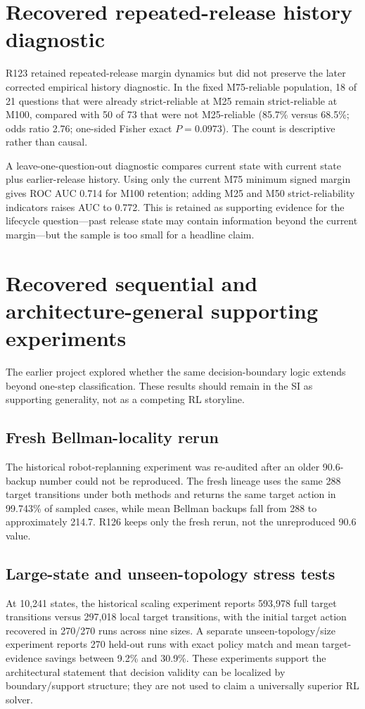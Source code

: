 \documentclass[11pt,letterpaper]{article}
\theoremstyle{plain}
\newcommand{\1}{\mathbf 1}
\begin{document}
\section{Recovered repeated-release history diagnostic}
R123 retained repeated-release margin dynamics but did not preserve the later corrected empirical history diagnostic. In the fixed M75-reliable population, 18 of 21 questions that were already strict-reliable at M25 remain strict-reliable at M100, compared with 50 of 73 that were not M25-reliable (85.7\% versus 68.5\%; odds ratio 2.76; one-sided Fisher exact $P=0.0973$). The count is descriptive rather than causal.

A leave-one-question-out diagnostic compares current state with current state plus earlier-release history. Using only the current M75 minimum signed margin gives ROC AUC 0.714 for M100 retention; adding M25 and M50 strict-reliability indicators raises AUC to 0.772. This is retained as supporting evidence for the lifecycle question---past release state may contain information beyond the current margin---but the sample is too small for a headline claim.

\clearpage
\section{Recovered sequential and architecture-general supporting experiments}
The earlier project explored whether the same decision-boundary logic extends beyond one-step classification. These results should remain in the SI as supporting generality, not as a competing RL storyline.

\subsection{Fresh Bellman-locality rerun}
The historical robot-replanning experiment was re-audited after an older 90.6-backup number could not be reproduced. The fresh lineage uses the same 288 target transitions under both methods and returns the same target action in 99.743\% of sampled cases, while mean Bellman backups fall from 288 to approximately 214.7. R126 keeps only the fresh rerun, not the unreproduced 90.6 value.

\subsection{Large-state and unseen-topology stress tests}
At 10,241 states, the historical scaling experiment reports 593,978 full target transitions versus 297,018 local target transitions, with the initial target action recovered in 270/270 runs across nine sizes. A separate unseen-topology/size experiment reports 270 held-out runs with exact policy match and mean target-evidence savings between 9.2\% and 30.9\%. These experiments support the architectural statement that decision validity can be localized by boundary/support structure; they are not used to claim a universally superior RL solver.
\end{document}
